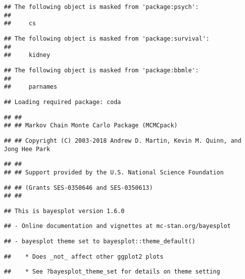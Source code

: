 \documentclass[]{article}
\begin{document}
\begin{verbatim}
## The following object is masked from 'package:psych':
## 
##     cs
\end{verbatim}

\begin{verbatim}
## The following object is masked from 'package:survival':
## 
##     kidney
\end{verbatim}

\begin{verbatim}
## The following object is masked from 'package:bbmle':
## 
##     parnames
\end{verbatim}

\begin{verbatim}
## Loading required package: coda
\end{verbatim}

\begin{verbatim}
## ##
## ## Markov Chain Monte Carlo Package (MCMCpack)
\end{verbatim}

\begin{verbatim}
## ## Copyright (C) 2003-2018 Andrew D. Martin, Kevin M. Quinn, and Jong Hee Park
\end{verbatim}

\begin{verbatim}
## ##
## ## Support provided by the U.S. National Science Foundation
\end{verbatim}

\begin{verbatim}
## ## (Grants SES-0350646 and SES-0350613)
## ##
\end{verbatim}

\begin{verbatim}
## This is bayesplot version 1.6.0
\end{verbatim}

\begin{verbatim}
## - Online documentation and vignettes at mc-stan.org/bayesplot
\end{verbatim}

\begin{verbatim}
## - bayesplot theme set to bayesplot::theme_default()
\end{verbatim}

\begin{verbatim}
##    * Does _not_ affect other ggplot2 plots
\end{verbatim}

\begin{verbatim}
##    * See ?bayesplot_theme_set for details on theme setting
\end{verbatim}
\end{document}
